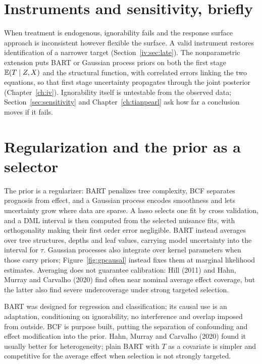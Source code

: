 \section{Instruments and sensitivity, briefly}

When treatment is endogenous, ignorability fails and the response surface approach is inconsistent however flexible the surface. A valid instrument restores identification of a narrower target (Section~\ref{iv:sec:late}). The nonparametric extension puts BART or Gaussian process priors on both the first stage $\mathbb{E}(T \mid Z, X)$ and the structural function, with correlated errors linking the two equations, so that first stage uncertainty propagates through the joint posterior (Chapter~\ref{ch:iv}). Ignorability itself is untestable from the observed data; Section~\ref{sec:sensitivity} and Chapter~\ref{ch:tianpearl} ask how far a conclusion moves if it fails.

\section{Regularization and the prior as a selector}

The prior is a regularizer: BART penalizes tree complexity, BCF separates prognosis from effect, and a Gaussian process encodes smoothness and lets uncertainty grow where data are sparse. A lasso selects one fit by cross validation, and a DML interval is then computed from the selected nuisance fits, with orthogonality making their first order error negligible. BART instead averages over tree structures, depths and leaf values, carrying model uncertainty into the interval for $\tau$. Gaussian processes also integrate over kernel parameters when those carry priors; Figure~\ref{fig:gpcausal} instead fixes them at marginal likelihood estimates. Averaging does not guarantee calibration: Hill (2011) and Hahn, Murray and Carvalho (2020) find often near nominal average effect coverage, but the latter also find severe undercoverage under strong targeted selection.

\begin{remark}
BART was designed for regression and classification; its causal use is an adaptation, conditioning on ignorability, no interference and overlap imposed from outside. BCF is purpose built, putting the separation of confounding and effect modification into the prior. Hahn, Murray and Carvalho (2020) found it usually better for heterogeneity; plain BART with $T$ as a covariate is simpler and competitive for the average effect when selection is not strongly targeted.
\end{remark}


